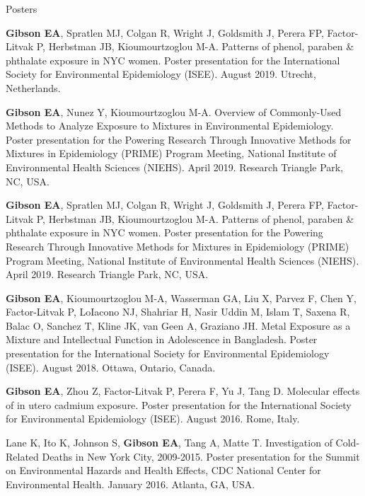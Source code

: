 \documentclass[a4paper,10pt]{article}
\newlength{\cvcolumngapwidth}
\newlength{\cvleftcolumnwidth}
\newlength{\cvrightcolumnwidth}
\newcommand{\cvdurationstyle}[1]{{\small\cvdurationfont\textcolor{cvdurationcolor}{#1}}}
\newlength{\cvafteritemskipamount}
\newlength{\cvparskip}
\newcommand{\cvitem}[2]{
    \begin{minipage}[t]{\cvleftcolumnwidth}
        \raggedleft #1
    \end{minipage}%
    \hspace{\cvcolumngapwidth}%
    \begin{minipage}[t]{\cvrightcolumnwidth}
        \setlength{\parskip}{\cvparskip} #2
    \end{minipage}

    \vspace{\cvafteritemskipamount}
}
\begin{document}
\cvitem{
    \cvdurationstyle{Posters}
}{  
    \begin{etaremune}
   	 \item \textbf{Gibson EA}, Spratlen MJ, Colgan R, Wright J, Goldsmith J, Perera FP, Factor-Litvak P, Herbstman JB, Kioumourtzoglou M-A. Patterns of phenol, paraben \& phthalate exposure in NYC women. Poster presentation for the International Society for Environmental Epidemiology (ISEE). August 2019. Utrecht, Netherlands. 
	\item \textbf{Gibson EA}, Nunez Y, Kioumourtzoglou M-A. Overview of Commonly-Used Methods to Analyze Exposure to Mixtures in Environmental Epidemiology. Poster presentation for the Powering Research Through Innovative Methods for Mixtures in Epidemiology (PRIME) Program Meeting, National Institute of Environmental Health Sciences (NIEHS). April 2019. Research Triangle Park, NC, USA. 
	\item \textbf{Gibson EA}, Spratlen MJ, Colgan R, Wright J, Goldsmith J, Perera FP, Factor-Litvak P, Herbstman JB, Kioumourtzoglou M-A. Patterns of phenol, paraben \& phthalate exposure in NYC women. Poster presentation for the Powering Research Through Innovative Methods for Mixtures in Epidemiology (PRIME) Program Meeting, National Institute of Environmental Health Sciences (NIEHS). April 2019. Research Triangle Park, NC, USA. 
    	\item \textbf{Gibson EA}, Kioumourtzoglou M-A, Wasserman GA, Liu X, Parvez F, Chen Y, Factor-Litvak P, LoIacono NJ, Shahriar H, Nasir Uddin M, Islam T, Saxena R, Balac O, Sanchez T, Kline JK, van Geen A, Graziano JH. Metal Exposure as a Mixture and Intellectual Function in Adolescence in Bangladesh. Poster presentation for the International Society for Environmental Epidemiology (ISEE). August 2018. Ottawa, Ontario, Canada.
	\item \textbf{Gibson EA}, Zhou Z, Factor-Litvak P, Perera F, Yu J, Tang D. Molecular effects of in utero cadmium exposure. Poster presentation for the International Society for Environmental Epidemiology (ISEE). August 2016. Rome, Italy. 
	\item Lane K, Ito K, Johnson S, \textbf{Gibson EA}, Tang A, Matte T. Investigation of Cold-Related Deaths in New York City, 2009-2015. Poster presentation for the Summit on Environmental Hazards and Health Effects, CDC National Center for Environmental Health. January 2016. Atlanta, GA, USA. \\
    \end{etaremune}
}
\end{document}
